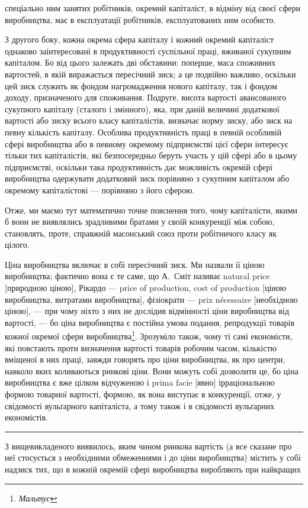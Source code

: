 \parcont{}  %
спеціально ним занятих робітників, окремий капіталіст, в відміну
від своєї сфери виробництва, має в експлуатації робітників, експлуатованих
ним особисто.

З другого боку, кожна окрема сфера капіталу і кожний окремий
капіталіст однаково заінтересовані в продуктивності суспільної
праці, вживаної сукупним капіталом. Бо від цього залежать
дві обставини: поперше, маса споживних вартостей, в якій виражається
пересічний зиск; а це подвійно важливо, оскільки цей
зиск служить як фондом нагромадження нового капіталу, так
і фондом доходу, призначеного для споживання. Подруге, висота
вартості авансованого сукупного капіталу (сталого і змінного),
яка, при даній величині додаткової вартості або зиску всього
класу капіталістів, визначає норму зиску, або зиск на певну
кількість капіталу. Особлива продуктивність праці в певній
особливій сфері виробництва або в певному окремому підприємстві
цієї сфери інтересує тільки тих капіталістів, які безпосередньо
беруть участь у цій сфері або в цьому підприємстві,
оскільки така продуктивність дає можливість окремій сфері
виробництва одержувати додатковий зиск порівняно з сукупним
капіталом або окремому капіталістові — порівняно з його сферою.

Отже, ми маємо тут математично точне пояснення того,
чому капіталісти, якими б вони не виявлялись зрадливими братами
у своїй конкуренції між собою, становлять, проте, справжній
масонський союз проти робітничого класу як цілого.

Ціна виробництва включає в собі пересічний зиск. Ми назвали
її ціною виробництва; фактично вона є те саме, що А.~Сміт називає
natural price [природною ціною], Рікардо — price of production,
cost of production [ціною виробництва, витратами виробництва],
фізіократи — prix nécessaire [необхідною ціною], — при
чому ніхто з них не дослідив відмінності ціни виробництва від
вартості, — бо ціна виробництва є постійна умова подання, репродукції
товарів кожної окремої сфери виробництва\footnote{
\emph{Мальтус}
}. Зрозуміло
також, чому ті самі економісти, які повстають проти визначення
вартості товарів робочим часом, кількістю вміщеної в них праці,
завжди говорять про ціни виробництва, як про центри, навколо
яких коливаються ринкові ціни. Вони можуть собі дозволити це,
бо ціна виробництва є вже цілком відчуженою і prima facie [явно]
ірраціональною формою товарної вартості, формою, як вона виступає
в конкуренції, отже, у свідомості вульґарного капіталіста,
а тому також і в свідомості вульґарних економістів.

\pfbreak

З вищевикладеного виявилось, яким чином ринкова вартість
(а все сказане про неї стосується з необхідними обмеженнями
і до ціни виробництва) містить у собі надзиск тих, що в кожній
окремій сфері виробництва виробляють при найкращих
\parbreak{}  %

